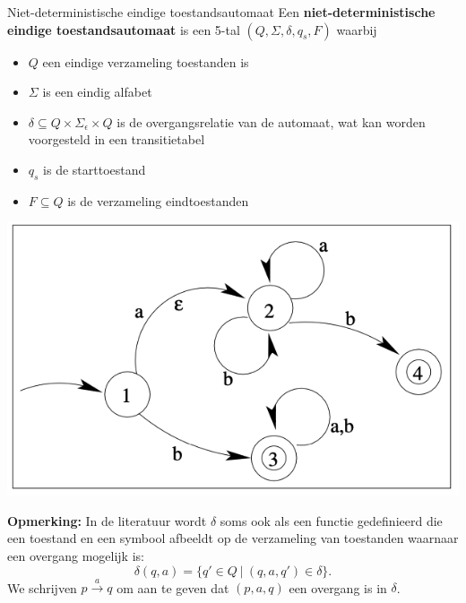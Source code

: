 \begin{theo}{Niet-deterministische eindige toestandsautomaat}
    Een \textbf{niet-deterministische eindige toestandsautomaat} is een 5-tal $(Q,\Sigma, \delta, q_s, F)$ waarbij

    \vspace{0.5cm}

    \begin{minipage}{.61\textwidth}
        \begin{itemize}
            \item $Q$ een eindige verzameling toestanden is
            \item $\Sigma$ is een eindig alfabet
            \item $\delta \subseteq Q \times \Sigma_{\epsilon} \times Q$ is de overgangsrelatie van de automaat, wat kan worden voorgesteld in een transitietabel
            \item $q_s$ is de starttoestand
            \item $F \subseteq Q$ is de verzameling eindtoestanden
        \end{itemize}
    \end{minipage}
    \hspace{0.3cm}
    \begin{minipage}{.35\textwidth}
        \begin{center}
            \includegraphics[scale = 0.25]{Images/NFA}
        \end{center}
    \end{minipage}

    \vspace{0.5cm}

    \textbf{Opmerking:} In de literatuur wordt $\delta$ soms ook als een functie gedefinieerd die een toestand en een symbool afbeeldt op de verzameling van toestanden waarnaar een overgang mogelijk is:
    \begin{equation*}
        \delta(q,a) = \{ q' \in Q \ | \ (q,a,q') \in \delta \}.
    \end{equation*}
    We schrijven $p \overset{a}{\longrightarrow} q$ om aan te geven dat $(p,a,q)$ een overgang is in $\delta$.
\end{theo}
    
